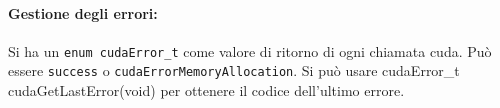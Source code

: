 \paragraph{Gestione degli errori:} Si ha un \texttt{enum cudaError\_t} come valore di ritorno di ogni chiamata cuda. Può essere \texttt{success} o \texttt{cudaErrorMemoryAllocation}. Si può usare {cudaError\_t cudaGetLastError(void)} per ottenere il codice dell'ultimo errore.\\



